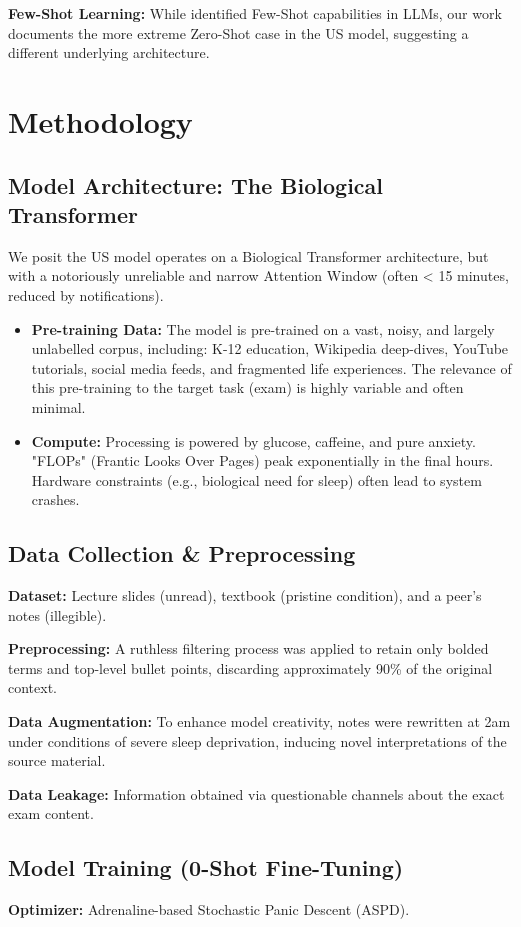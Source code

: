 \documentclass[11pt]{article}
\newcommand{\defitem}[1]{\vspace{0.8em}\noindent\textbf{#1}}
\begin{document}
\defitem{Few-Shot Learning:} While \cite{brown2020language} identified Few-Shot capabilities in LLMs, our work documents the more extreme Zero-Shot case in the US model, suggesting a different underlying architecture.

\section{Methodology}
\subsection{Model Architecture: The Biological Transformer}
We posit the US model operates on a Biological Transformer architecture, but with a notoriously unreliable and narrow Attention Window (often < 15 minutes, reduced by notifications).
\begin{itemize}
    \item \textbf{Pre-training Data:} The model is pre-trained on a vast, noisy, and largely unlabelled corpus, including: K-12 education, Wikipedia deep-dives, YouTube tutorials, social media feeds, and fragmented life experiences. The relevance of this pre-training to the target task (exam) is highly variable and often minimal.
    \item \textbf{Compute:} Processing is powered by glucose, caffeine, and pure anxiety. "FLOPs" (Frantic Looks Over Pages) peak exponentially in the final hours. Hardware constraints (e.g., biological need for sleep) often lead to system crashes.
\end{itemize}

\subsection{Data Collection \& Preprocessing}
\defitem{Dataset:} Lecture slides (unread), textbook (pristine condition), and a peer's notes (illegible).

\defitem{Preprocessing:} A ruthless filtering process was applied to retain only bolded terms and top-level bullet points, discarding approximately 90\% of the original context.

\defitem{Data Augmentation:} To enhance model creativity, notes were rewritten at 2am under conditions of severe sleep deprivation, inducing novel interpretations of the source material.

\defitem{Data Leakage:} Information obtained via questionable channels about the exact exam content.

\subsection{Model Training (0-Shot Fine-Tuning)}
\defitem{Optimizer:} Adrenaline-based Stochastic Panic Descent (ASPD).
\end{document}
